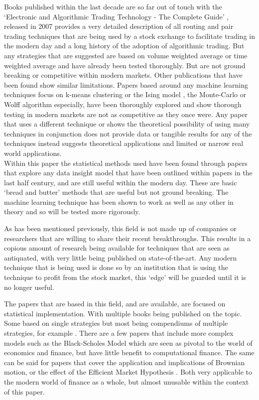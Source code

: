 \documentclass[conference]{IEEEtran}
\begin{document}
Books published within the last decade are so far out of touch with the `Electronic and Algorithmic Trading Technology - The Complete Guide' \cite{Kim2007}, released in 2007 provides a very detailed description of all routing and pair trading techniques that are being used by a stock exchange to facilitate trading in the modern day and a long history of the adoption of algorithmic trading. But any strategies that are suggested are based on volume weighted average or time weighted average and have already been tested thoroughly. But are not ground breaking or competitive within modern markets. Other publications that have been found show similar limitations. Papers based around any machine learning techniques focus on k-means clustering \cite{Gerlein2016} or the Ising model \cite{Lima2017}, the Monte-Carlo or Wolff algorithm especially, have been thoroughly explored and show thorough testing in modern markets are not as competitive as they once were. Any paper that uses a different technique or shows the theoretical possibility of using many techniques in conjunction does not provide data or tangible results for any of the techniques instead suggests theoretical applications and limited or narrow real world applications.\\

Within this paper the statistical methods used have been found through papers that explore any data insight model that have been outlined within papers in the last half century, and are still useful within the modern day. These are basic `bread and butter' methods that are useful but not ground breaking. The machine learning technique has been shown to work as well as any other in theory and so will be tested more rigorously.\\
\fi

As has been mentioned previously, this field is not made up of companies or researchers that are willing to share their recent breakthroughs. This results in a copious amount of research being available for techniques that are seen as antiquated, with very little being published on state-of-the-art. Any modern technique that is being used is done so by an institution that is using the technique to profit from the stock market, this `edge'  will be guarded until it is no longer useful.

The papers that are based in this field, and are available, are focused on statistical implementation. With multiple books being published on the topic. Some based on single strategies but most being compendiums of multiple strategies, for example \cite{Murphy1999}. There are a few papers that include more complex models such as the Black-Scholes Model \cite{Saad2015} which are seen as pivotal to the world of economics and finance, but have little benefit to computational finance. The same can be said for papers that cover the application and implications of Brownian motion, or the effect of the Efficient Market Hypothesis \cite{Meng2016}. Both very applicable to the modern world of finance as a whole, but almost unusable within the context of this paper.
\end{document}
